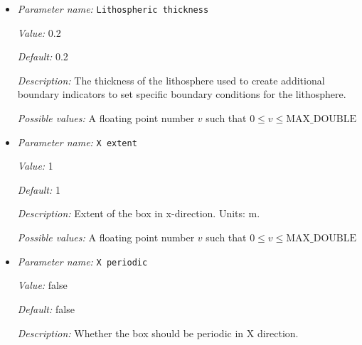 \begin{itemize}
{\it Default:} 0


{\it Description:} Z coordinate of box origin. This value is ignored if the simulation is in 2d. Units: m.


{\it Possible values:} A floating point number $v$ such that $-\text{MAX\_DOUBLE} \leq v \leq \text{MAX\_DOUBLE}$
\item {\it Parameter name:} {\tt Lithospheric thickness}
\label{parameters:Geometry model/Box with lithosphere boundary indicators/Lithospheric thickness}
\label{parameters:Geometry_20model/Box_20with_20lithosphere_20boundary_20indicators/Lithospheric_20thickness}


{\it Value:} 0.2


{\it Default:} 0.2


{\it Description:} The thickness of the lithosphere used to create additional boundary indicators to set specific boundary conditions for the lithosphere. 


{\it Possible values:} A floating point number $v$ such that $0 \leq v \leq \text{MAX\_DOUBLE}$
\item {\it Parameter name:} {\tt X extent}
\label{parameters:Geometry model/Box with lithosphere boundary indicators/X extent}
\label{parameters:Geometry_20model/Box_20with_20lithosphere_20boundary_20indicators/X_20extent}


{\it Value:} 1


{\it Default:} 1


{\it Description:} Extent of the box in x-direction. Units: m.


{\it Possible values:} A floating point number $v$ such that $0 \leq v \leq \text{MAX\_DOUBLE}$
\item {\it Parameter name:} {\tt X periodic}
\label{parameters:Geometry model/Box with lithosphere boundary indicators/X periodic}
\label{parameters:Geometry_20model/Box_20with_20lithosphere_20boundary_20indicators/X_20periodic}


{\it Value:} false


{\it Default:} false


{\it Description:} Whether the box should be periodic in X direction.



\end{itemize}
